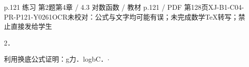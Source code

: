\begin{bankitem}{p.121 练习 第2题}{第4章 / 4.3 对数函数 / 教材 p.121 / PDF 第128页}{XJ-B1-C04-PR-P121-Y0261}{OCR未校对：公式与文字均可能有误；未完成数学TeX转写；禁止直接发给学生}
\begin{ocrdraft}
\par
2．
\par
利用换底公式证明：g力．logbC．\ensuremath{\cdot}
\end{ocrdraft}
\end{bankitem}
